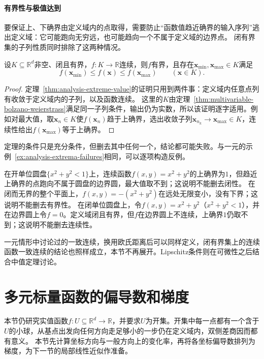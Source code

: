\paragraph{有界性与极值达到}
要保证上、下确界由定义域内的点取得，需要防止“函数值趋近确界的输入序列”逃出定义域：它可能跑向无穷远，也可能趋向一个不属于定义域的边界点。
闭有界集的子列性质同时排除了这两种情况。
\begin{theorem}[闭有界集上的极值定理]
\label{thm:multivariable-extreme-value}
设$K\subseteq\mathbb R^d$非空、闭且有界，$f:K\to\mathbb R$连续，则$f$有界，且存在$\bm x_{\min},\bm x_{\max}\in K$满足
\[
 f(\bm x_{\min})\leq f(\bm x)\leq f(\bm x_{\max})\qquad(\bm x\in K).
\]
\end{theorem}
\begin{proof}
定理~\ref{thm:analysis-extreme-value}的证明只用到两件事：定义域内任意点列有收敛于定义域内的子列，以及函数连续。
这里的$K$由定理~\ref{thm:multivariable-bolzano-weierstrass}满足同一子列条件，输出仍为实数，所以该证明逐字适用。例如对最大值，取$\bm x_n\in K$使$f(\bm x_n)$趋于上确界，选出收敛子列$\bm x_{n_k}\to\bm x_{\max}\in K$，连续性给出$f(\bm x_{\max})$等于上确界。
\end{proof}
定理的条件只是充分条件，但删去其中任何一个，结论都可能失败。与一元的示例~\ref{ex:analysis-extrema-failures}相同，可以逐项构造反例。
\begin{example}
\label{ex:multivariable-extreme-value-failures}
在开单位圆盘$\{x^2+y^2<1\}$上，连续函数$f(x,y)=x^2+y^2$的上确界为$1$，但趋近上确界的点跑向不属于圆盘的边界圆，最大值取不到；这说明不能删去闭性。
在闭而无界的整个平面上，$f(x,y)=-(x^2+y^2)$在远处无限变小，没有下界；这说明不能删去有界性。
在闭单位圆盘上，令$f(x,y)=x^2+y^2$（$x^2+y^2<1$），并在边界圆上令$f=0$。定义域闭且有界，但$f$在边界圆上不连续，上确界$1$仍取不到；这说明不能删去连续性。
\end{example}

一元情形中讨论过的一致连续，换用欧氏距离后可以同样定义，闭有界集上的连续函数一致连续的结论也照样成立，本节不再展开。Lipschitz条件则在可微性之后结合中值定理讨论。

\section{多元标量函数的偏导数和梯度}

本节仍研究实值函数$f:U\subseteq\mathbb R^d\to\mathbb R$，并要求$U$为开集。开集中每一点都有一个含于$U$的小球，从基点出发向任何方向走足够小的一步仍在定义域内，双侧差商因而都有意义。
本节先计算坐标方向与一般方向上的变化率，再将各坐标偏导数排列为梯度，为下一节的局部线性近似作准备。

